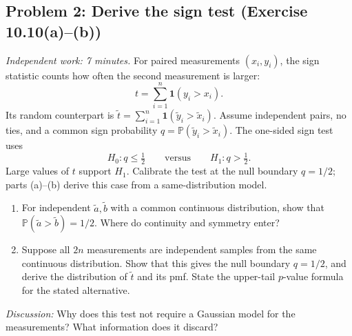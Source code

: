 \documentclass[11pt]{article}
\newcommand{\rv}[1]{\widetilde{#1}}
\newcommand{\Pbb}{\mathbb P}
\newcommand{\workingspace}[1]{}
\newcommand{\workingspace}[1]{\vspace{#1}}
\begin{document}
\subsection*{Problem 2: Derive the sign test (Exercise 10.10(a)--(b))}
\noindent\textit{Independent work: 7 minutes.}
For paired measurements $(x_i,y_i)$, the sign statistic counts how often
the second measurement is larger:
\[
 t=\sum_{i=1}^n\mathbf 1(y_i>x_i).
\]
Its random counterpart is $\rv t=\sum_{i=1}^n\mathbf 1(\rv y_i>\rv x_i)$.
Assume independent pairs, no ties, and a common sign probability
$q=\Pbb(\rv y_i>\rv x_i)$. The one-sided sign test uses
\[
 \boxed{H_0:q\leq\tfrac12\qquad\text{versus}\qquad H_1:q>\tfrac12.}
\]
Large values of $t$ support $H_1$. Calibrate the test at the null boundary
$q=1/2$; parts (a)--(b) derive this case from a same-distribution model.
\begin{enumerate}
 \item For independent $\rv a,\rv b$ with a common continuous distribution,
 show that \mbox{$\Pbb(\rv a>\rv b)=1/2$}.
 Where do continuity and symmetry enter?
 \item Suppose all $2n$ measurements are independent samples from the
 same continuous distribution. Show that this gives the null boundary
 $q=1/2$, and derive the distribution of $\rv t$ and its pmf.
 State the upper-tail $p$-value formula for the stated alternative.
\end{enumerate}
\noindent\textit{Discussion:} Why does this test not require a Gaussian
model for the measurements? What information does it discard?
\workingspace{10cm}
\end{document}
